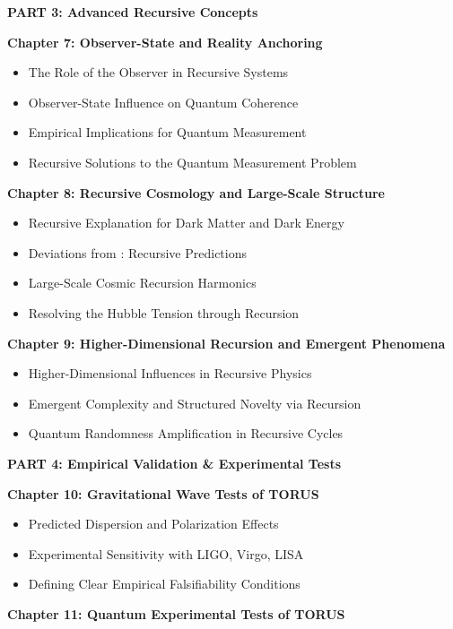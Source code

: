 \documentclass[]{article}
\begin{document}
\textbf{PART 3: Advanced Recursive Concepts}

\textbf{Chapter 7: Observer-State and Reality Anchoring}

\begin{itemize}
\item
  The Role of the Observer in Recursive Systems
\item
  Observer-State Influence on Quantum Coherence
\item
  Empirical Implications for Quantum Measurement
\item
  Recursive Solutions to the Quantum Measurement Problem
\end{itemize}

\textbf{Chapter 8: Recursive Cosmology and Large-Scale Structure}

\begin{itemize}
\item
  Recursive Explanation for Dark Matter and Dark Energy
\item
  Deviations from \LambdaCDM: Recursive Predictions
\item
  Large-Scale Cosmic Recursion Harmonics
\item
  Resolving the Hubble Tension through Recursion
\end{itemize}

\textbf{Chapter 9: Higher-Dimensional Recursion and Emergent Phenomena}

\begin{itemize}
\item
  Higher-Dimensional Influences in Recursive Physics
\item
  Emergent Complexity and Structured Novelty via Recursion
\item
  Quantum Randomness Amplification in Recursive Cycles
\end{itemize}

\textbf{PART 4: Empirical Validation \& Experimental Tests}

\textbf{Chapter 10: Gravitational Wave Tests of TORUS}

\begin{itemize}
\item
  Predicted Dispersion and Polarization Effects
\item
  Experimental Sensitivity with LIGO, Virgo, LISA
\item
  Defining Clear Empirical Falsifiability Conditions
\end{itemize}

\textbf{Chapter 11: Quantum Experimental Tests of TORUS}
\end{document}
